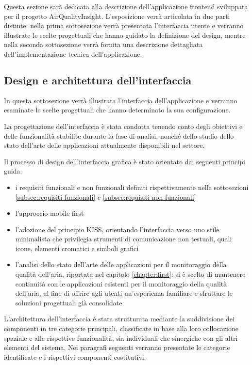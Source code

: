 Questa sezione sarà dedicata alla descrizione dell'applicazione frontend sviluppata per il progetto AirQualityInsight.
L'esposizione verrà articolata in due parti distinte: nella prima sottosezione verrà presentata
l'interfaccia utente e verranno illustrate le scelte progettuali che hanno guidato la definizione del design,
mentre nella seconda sottosezione verrà fornita una descrizione dettagliata dell'implementazione
tecnica dell'applicazione.

\subsection{Design e architettura dell'interfaccia}

In questa sottosezione verrà illustrata l'interfaccia dell'applicazione e verranno esaminate le scelte progettuali
che hanno determinato la sua configurazione.

La progettazione dell'interfaccia è stata condotta tenendo conto degli obiettivi e delle funzionalità stabilite
durante la fase di analisi, nonché dello studio dello stato dell'arte delle applicazioni attualmente
disponibili nel settore.

Il processo di design dell'interfaccia grafica è stato orientato dai seguenti principi guida:
\begin{itemize}
  \item i requisiti funzionali e non funzionali definiti rispettivamente nelle sottosezioni
        \ref{subsec:requisiti-funzionali} e \ref{subsec:requisiti-non-funzionali}
  \item l'approccio mobile-first
  \item l'adozione del principio KISS, orientando l'interfaccia verso uno stile minimalista che privilegia strumenti
        di comunicazione non testuali, quali icone, elementi cromatici e simboli grafici
  \item l'analisi dello stato dell'arte delle applicazioni per il monitoraggio della qualità dell'aria,
        riportata nel capitolo \ref{chapter:first}: si è scelto di mantenere continuità
        con le applicazioni esistenti per il monitoraggio della qualità dell'aria, al fine di offrire agli utenti
        un'esperienza familiare e sfruttare le soluzioni progettuali già consolidate
\end{itemize}
L'architettura dell'interfaccia è stata strutturata mediante la suddivisione dei componenti
in tre categorie principali, classificate in base alla loro collocazione spaziale e alle rispettive funzionalità,
sia individuali che sinergiche con gli altri elementi del sistema.
Nei paragrafi seguenti verranno presentate le categorie identificate e i rispettivi componenti costitutivi.

